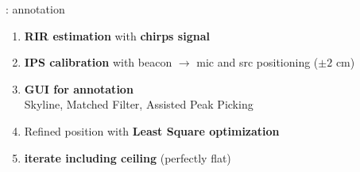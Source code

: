 \begin{frame}[t]{\dechorate: annotation}

    \begin{enumerate}
        \item<1-> \textbf{RIR estimation} with \textbf{chirps signal}~\cite{farina2007advancements,szoke2019building}
        \item<2-> \textbf{IPS calibration} with beacon $\longrightarrow$ mic and src positioning ($\pm 2$ cm)
        \item<3-> \textbf{GUI for annotation}
        \\\alert{Skyline}, \alert{Matched Filter}, Assisted Peak Picking
        \item<4-> Refined position with \textbf{Least Square optimization}
        \item<5-> \textbf{iterate including ceiling} (perfectly flat)
    \end{enumerate}

    \vfill


\end{frame}
